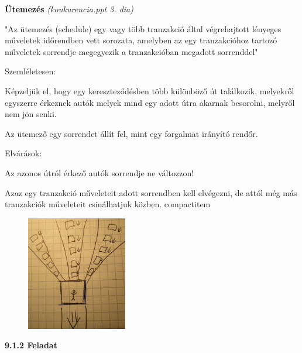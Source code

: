 \documentclass[a4paper,11.5pt, table]{article}
\begin{document}
	\textbf{Ütemezés} \textit{(konkurencia.ppt 3. dia)}
	\begin{compactitem}
		\item "Az ütemezés (schedule) egy vagy több tranzakció által végrehajtott lényeges műveletek időrendben vett sorozata, amelyben az egy tranzakcióhoz tartozó műveletek sorrendje megegyezik a tranzakcióban megadott sorrenddel"
		
		\item Szemléletesen:
		\begin{compactitem}
			\item Képzeljük el, hogy egy kereszteződésben több különböző út találkozik, melyekről egyszerre érkeznek autók melyek mind egy adott útra akarnak besorolni, melyről nem jön senki.
			\item Az ütemező egy sorrendet állít fel, mint egy forgalmat irányító rendőr.
			\item Elvárások:
			\begin{compactitem}
				\item Az azonos útról érkező autók sorrendje ne változzon!
				\item Azaz egy tranzakció műveleteit adott sorrendben kell elvégezni, de attól még más tranzakciók műveleteit csinálhatjuk közben.
			{compactitem}
			\begin{figure}[h]
				\centering
				\includegraphics[height = 5cm]{abra.jpg}
			\end{figure}
			\end{compactitem}
		\end{compactitem}
	\end{compactitem}
	

	\textbf{9.1.2 Feladat}
	
\end{document}
